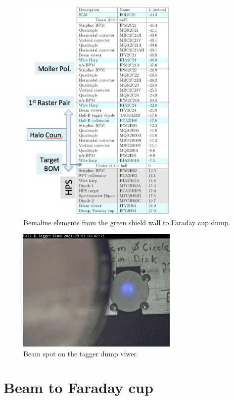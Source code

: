 \begin{figure}[htb!]
\centering
\includegraphics[width=0.7\textwidth]{beamline_elements.pdf}
\caption{Bemaline elements from the green shield wall to Faraday cup dump.}
\label{fig:belements}
\end{figure}
\begin{figure}[htb!]
\centering
\includegraphics[width=0.7\textwidth]{Tagger_viewer.pdf}
\caption{Beam spot on the tagger dump viwer.}
\label{fig:tagger_spot}
\end{figure}


\clearpage
\section{Beam to Faraday cup}
\indent

